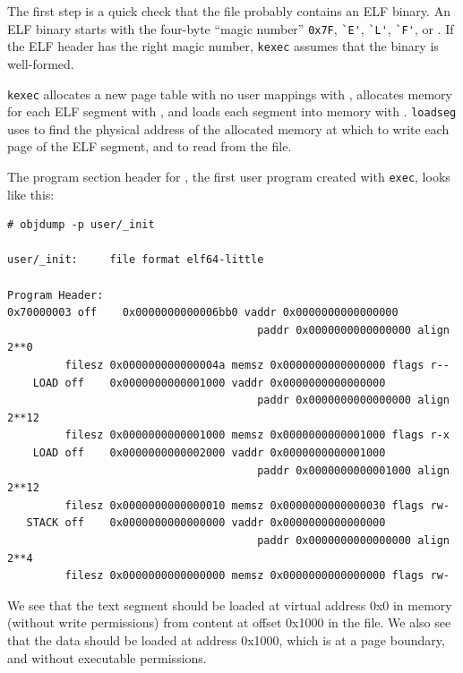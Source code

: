 The first step is a quick check that the file probably contains an
ELF binary.
An ELF binary starts with the four-byte ``magic number''
\lstinline{0x7F},
\lstinline{`E'},
\lstinline{`L'},
\lstinline{`F'},
or
.
If the ELF header has the right magic number,
\lstinline{kexec}
assumes that the binary is well-formed.

\lstinline{kexec}
allocates a new page table with no user mappings with
,
allocates memory for each ELF segment with
,
and loads each segment into memory with
.
\lstinline{loadseg}
uses
to find the physical address of the allocated memory at which to write
each page of the ELF segment, and
to read from the file.

The program section header for
,
the first user program created with
\lstinline{exec},
looks like this:
\begin{footnotesize}
\begin{verbatim}
# objdump -p user/_init

user/_init:     file format elf64-little

Program Header:
0x70000003 off    0x0000000000006bb0 vaddr 0x0000000000000000
                                       paddr 0x0000000000000000 align 2**0
         filesz 0x000000000000004a memsz 0x0000000000000000 flags r--
    LOAD off    0x0000000000001000 vaddr 0x0000000000000000
                                       paddr 0x0000000000000000 align 2**12
         filesz 0x0000000000001000 memsz 0x0000000000001000 flags r-x
    LOAD off    0x0000000000002000 vaddr 0x0000000000001000
                                       paddr 0x0000000000001000 align 2**12
         filesz 0x0000000000000010 memsz 0x0000000000000030 flags rw-
   STACK off    0x0000000000000000 vaddr 0x0000000000000000
                                       paddr 0x0000000000000000 align 2**4
         filesz 0x0000000000000000 memsz 0x0000000000000000 flags rw-
\end{verbatim}
\end{footnotesize}

We see that the text segment should be loaded at virtual address 0x0
in memory (without write permissions) from content at offset
0x1000 in the file. We also see that the data should be loaded at
address 0x1000, which is at a page boundary, and without executable
permissions.


